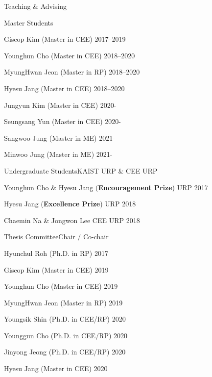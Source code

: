\begin{rSection}{Teaching \& Advising}
\begin{rSubsection}{Master Students}{}{}{}
  \item Giseop Kim (Master in \ac{CEE}) \hfill 2017--2019
  \item Younghun Cho (Master in \ac{CEE}) \hfill 2018--2020
  \item MyungHwan Jeon (Master in \ac{RP}) \hfill 2018--2020
  \item Hyesu Jang (Master in \ac{CEE}) \hfill 2018--2020
  \item Jungyun Kim (Master in \ac{CEE}) \hfill 2020-
  \item Seungsang Yun (Master in \ac{CEE}) \hfill 2020-
  \item Sangwoo Jung (Master in \ac{ME}) \hfill 2021-
  \item Minwoo Jung (Master in \ac{ME}) \hfill 2021-
\end{rSubsection}

\begin{rSubsection}{Undergraduate Students}{}{KAIST \acf{URP} \& CEE URP}{}
  \item Younghun Cho \& Hyesu Jang ({\bf Encouragement Prize}) \hfill URP 2017
  \item Hyesu Jang ({\bf Excellence Prize}) \hfill URP 2018
  \item Chaemin Na \& Jongwon Lee \hfill CEE URP 2018
\end{rSubsection}

\begin{rSubsection}{Thesis Committee}{}{Chair / Co-chair }{}
  \item Hyunchul Roh (Ph.D. in \ac{RP}) \hfill 2017
  \item Giseop Kim (Master in \ac{CEE}) \hfill 2019
  \item Younghun Cho (Master in \ac{CEE}) \hfill 2019
  \item MyungHwan Jeon (Master in \ac{RP}) \hfill 2019
  \item Youngsik Shin (Ph.D. in \ac{CEE}/\ac{RP}) \hfill 2020
  \item Younggun Cho (Ph.D. in \ac{CEE}/\ac{RP}) \hfill 2020
  \item Jinyong Jeong (Ph.D. in \ac{CEE}/\ac{RP}) \hfill 2020
  \item Hyesu Jang (Master in \ac{CEE}) \hfill 2020
\end{rSubsection}

\end{rSection}
